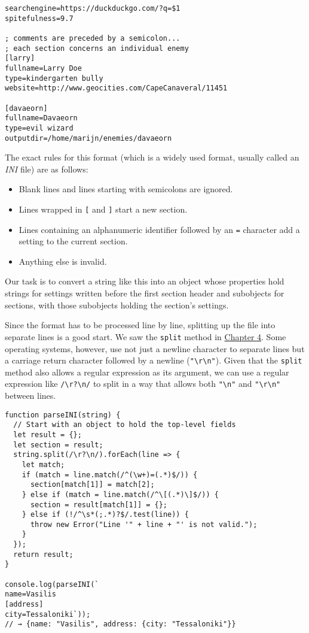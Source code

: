 \begin{lstlisting}
searchengine=https://duckduckgo.com/?q=$1
spitefulness=9.7

; comments are preceded by a semicolon...
; each section concerns an individual enemy
[larry]
fullname=Larry Doe
type=kindergarten bully
website=http://www.geocities.com/CapeCanaveral/11451

[davaeorn]
fullname=Davaeorn
type=evil wizard
outputdir=/home/marijn/enemies/davaeorn
\end{lstlisting}
\noindent{}

The exact rules for this format (which is a widely used format, usually called an \emph{INI} file) are as follows:

\begin{itemize}
\item 

Blank lines and lines starting with semicolons are ignored.
\item 

Lines wrapped in \lstinline`[` and \lstinline`]` start a new section.
\item 

Lines containing an alphanumeric identifier followed by an \lstinline`=` character add a setting to the current section.
\item 

Anything else is invalid.
\end{itemize}

Our task is to convert a string like this into an object whose properties hold strings for settings written before the first section header and subobjects for sections, with those subobjects holding the section's settings.

Since the format has to be processed line by line, splitting up the file into separate lines is a good start. We saw the \lstinline`split` method in \hyperref[data.split]{Chapter 4}. Some operating systems, however, use not just a newline character to separate lines but a carriage return character followed by a newline (\lstinline`"\r\n"`). Given that the \lstinline`split` method also allows a regular expression as its argument, we can use a regular expression like \lstinline`/\r?\n/` to split in a way that allows both \lstinline`"\n"` and \lstinline`"\r\n"` between lines.

\begin{lstlisting}
function parseINI(string) {
  // Start with an object to hold the top-level fields
  let result = {};
  let section = result;
  string.split(/\r?\n/).forEach(line => {
    let match;
    if (match = line.match(/^(\w+)=(.*)$/)) {
      section[match[1]] = match[2];
    } else if (match = line.match(/^\[(.*)\]$/)) {
      section = result[match[1]] = {};
    } else if (!/^\s*(;.*)?$/.test(line)) {
      throw new Error("Line '" + line + "' is not valid.");
    }
  });
  return result;
}

console.log(parseINI(`
name=Vasilis
[address]
city=Tessaloniki`));
// → {name: "Vasilis", address: {city: "Tessaloniki"}}
\end{lstlisting}
\noindent{}

